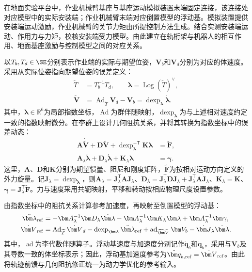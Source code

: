 在地面实验平台中，作业机械臂基座与基座运动模拟装置末端固定连接，该连接处对应模型中的实际安装端；作业机械臂末端对应倒置模型的浮动基。模拟装置提供安装端运动激励，作业机械臂的关节力矩由所提控制方法生成。结合实测安装端运动、作用力与力矩，校核安装端受力模型。由此建立在轨桁架与机器人的相互作用、地面基座激励与控制模型之间的对应关系。

以$T_b,T_d\in\SE$分别表示作业端的实际与期望位姿，$\bm V_b$和$\bm V_d$分别为对应的体速度。采用从实际位姿指向期望位姿的误差定义：
\begin{equation}
\begin{aligned}
 \widetilde T&=T_b^{-1}T_d,\qquad
 \bm\lambda=\operatorname{Log}(\widetilde T)^\vee,\\
 \widetilde{\bm V}
 &=\operatorname{Ad}_{\widetilde T}\bm V_d-\bm V_b
 =\operatorname{dexp}_{\bm\lambda}\dot{\bm\lambda}.
\end{aligned}
\label{eq:pose_error}
\end{equation}
其中，$\bm\lambda\in\mathbb R^6$为局部指数坐标，$\operatorname{Ad}$为群伴随映射，$\operatorname{dexp}_{\bm\lambda}$为与上述相对速度约定一致的指数映射微分。在李群上设计几何阻抗关系，并将其转换为指数坐标中的误差动态\cite{kim2025}：
\begin{equation}
\begin{aligned}
 \bm A\dot{\widetilde{\bm V}}+\bm D\widetilde{\bm V}
 +\operatorname{dexp}_{\bm\lambda}^{-\mathsf T}\bm K\bm\lambda
 &=\widetilde{\bm F},\\
 \bm A_\lambda\ddot{\bm\lambda}
 +\bm D_\lambda\dot{\bm\lambda}+\bm K_\lambda\bm\lambda
 &=\bm\gamma.
\end{aligned}
\label{eq:impedance}
\end{equation}
这里，$\bm A$、$\bm D$和$\bm K$分别为期望惯量、阻尼和刚度矩阵，$\widetilde{\bm F}$为按相对运动方向定义的外力旋量。记$\bm J_\lambda=\operatorname{dexp}_{\bm\lambda}$，则$\bm A_\lambda=\bm J_\lambda^{\mathsf T}\bm A\bm J_\lambda$、$\bm D_\lambda=\bm J_\lambda^{\mathsf T}\bm D\bm J_\lambda+\bm J_\lambda^{\mathsf T}\bm A\dot{\bm J}_\lambda$、$\bm K_\lambda=\bm K$、$\bm\gamma=\bm J_\lambda^{\mathsf T}\widetilde{\bm F}$。力与速度采用共轭映射，平移和转动按相应物理尺度设置参数。

由指数坐标中的阻抗关系计算参考加速度，再映射至倒置模型的浮动基：
\begin{equation}
\begin{aligned}
 \ddot{\bm\lambda}_{\rm ref}
 &=-\bm A_\lambda^{-1}\bm D_\lambda\dot{\bm\lambda}
   -\bm A_\lambda^{-1}\bm K_\lambda\bm\lambda
   +\bm A_\lambda^{-1}\bm\gamma,\\
 \dot{\bm V}_{\rm ref}
 &=\operatorname{Ad}_{\widetilde T}\dot{\bm V}_d
   -\operatorname{dexp}_{\bm\lambda}\ddot{\bm\lambda}_{\rm ref}
   +\operatorname{ad}_{\widetilde{\bm V}}\bm V_b
   -\dot{\bm J}_\lambda\dot{\bm\lambda}.
\end{aligned}
\label{eq:impedance_reference}
\end{equation}
其中，$\operatorname{ad}$为李代数伴随算子。浮动基速度与加速度分别记作$\dot{\bm q}_b$和$\ddot{\bm q}_b$，采用与$\bm V_b$及其导数一致的体坐标表示；因此，浮动基加速度参考为$\ddot{\bm q}_{b,\rm ref}=\dot{\bm V}_{\rm ref}$。由此将轨迹前馈与几何阻抗修正统一为动力学优化的参考输入。

